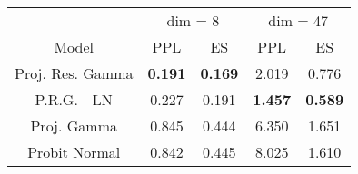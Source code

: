 
\begin{tabular}{ccccc}
\toprule
\multicolumn{1}{c}{ } & \multicolumn{2}{c}{dim = 8} & \multicolumn{2}{c}{dim = 47} \\
\cmidrule(l{3pt}r{3pt}){2-3} \cmidrule(l{3pt}r{3pt}){4-5}
Model & PPL & ES & PPL & ES\\
\midrule
Proj. Res. Gamma & {\bf 0.191} & {\bf 0.169} & 2.019 & 0.776\\
P.R.G. - LN & 0.227 & 0.191 & {\bf 1.457} & {\bf 0.589}\\
Proj. Gamma & 0.845 & 0.444 & 6.350 & 1.651\\
Probit Normal & 0.842 & 0.445 & 8.025 & 1.610\\
\bottomrule
\end{tabular}